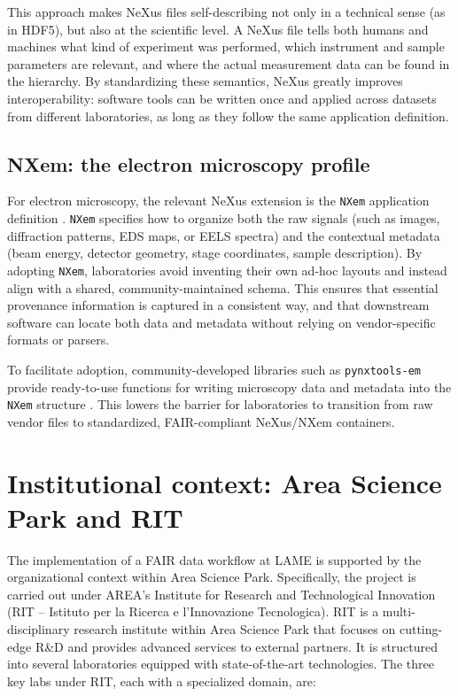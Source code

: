This approach makes NeXus files self-describing not only in a technical sense (as in HDF5), but also at the scientific level. 
A NeXus file tells both humans and machines what kind of experiment was performed, which instrument and sample parameters are relevant, and where the actual measurement data can be found in the hierarchy. 
By standardizing these semantics, NeXus greatly improves interoperability: software tools can be written once and applied across datasets from different laboratories, as long as they follow the same application definition.

\subsection{NXem: the electron microscopy profile}

For electron microscopy, the relevant NeXus extension is the \texttt{NXem} application definition \parencite{bazzocchiNexusEM,nexusEMStructure}. 
\texttt{NXem} specifies how to organize both the raw signals (such as images, diffraction patterns, EDS maps, or EELS spectra) and the contextual metadata (beam energy, detector geometry, stage coordinates, sample description). 
By adopting \texttt{NXem}, laboratories avoid inventing their own ad-hoc layouts and instead align with a shared, community-maintained schema. 
This ensures that essential provenance information is captured in a consistent way, and that downstream software can locate both data and metadata without relying on vendor-specific formats or parsers.

To facilitate adoption, community-developed libraries such as \texttt{pynxtools-em} provide ready-to-use functions for writing microscopy data and metadata into the \texttt{NXem} structure \parencite{pynxtools_nexus_validation}. 
This lowers the barrier for laboratories to transition from raw vendor files to standardized, FAIR-compliant NeXus/NXem containers.

\section{Institutional context: Area Science Park and RIT}

The implementation of a FAIR data workflow at LAME is supported by the organizational context within Area Science Park. Specifically, the project is carried out under AREA’s Institute for Research and Technological Innovation (RIT – Istituto per la Ricerca e l’Innovazione Tecnologica). RIT is a multi-disciplinary research institute within Area Science Park that focuses on cutting-edge R\&D and provides advanced services to external partners. It is structured into several laboratories equipped with state-of-the-art technologies. The three key labs under RIT, each with a specialized domain, are:

